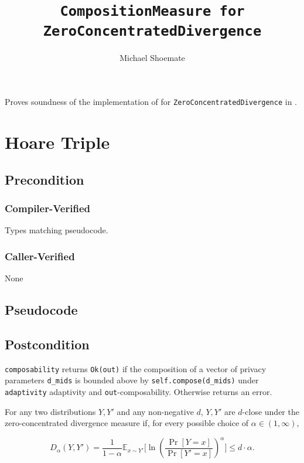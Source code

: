 \documentclass{article}
\title{\texttt{CompositionMeasure for ZeroConcentratedDivergence}}
\author{Michael Shoemate}
\date{}
\begin{document}
\maketitle

\contrib
Proves soundness of the implementation of  
for \texttt{ZeroConcentratedDivergence} in .

\section{Hoare Triple}
\subsection*{Precondition}
\subsubsection*{Compiler-Verified}
Types matching pseudocode.


\subsubsection*{Caller-Verified}
None

\subsection*{Pseudocode}


\subsection*{Postcondition}
\begin{theorem}
  \texttt{composability} returns \texttt{Ok(out)} if the composition of a vector of privacy parameters \texttt{d\_mids} 
  is bounded above by \texttt{self.compose(d\_mids)} under \texttt{adaptivity} adaptivity and \texttt{out}-composability.
  Otherwise returns an error.
\end{theorem}

\begin{definition}
  \label{def:zc-div}
  For any two distributions $Y, Y'$ and any non-negative $d$,
  $Y, Y'$ are $d$-close under the zero-concentrated divergence measure if,
  for every possible choice of $\alpha \in (1, \infty)$,

  \begin{equation}
    D_\alpha(Y, Y') = \frac{1}{1 - \alpha} \mathbb{E}_{x \sim Y'} \Big[\ln \left( \dfrac{\Pr[Y = x]}{\Pr[Y' = x]} \right)^\alpha \Big] \leq d \cdot \alpha.
  \end{equation}
\end{definition}
\end{document}
